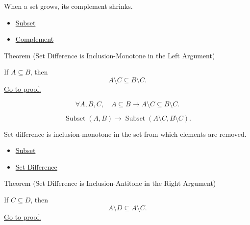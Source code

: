 \begin{remark*}[Interpretation]
When a set grows, its complement shrinks.
\end{remark*}

\begin{dependencies}
\begin{itemize}
  \item \hyperref[def:subset]{Subset}
  \item \hyperref[def:complement]{Complement}
\end{itemize}
\end{dependencies}

\begin{theorembox}{Theorem (Set Difference is Inclusion-Monotone in the Left Argument)}
\begin{theorem}\label{thm:set-difference-monotone-left}
If $A\subseteq B$, then
\[
A\setminus C\subseteq B\setminus C.
\]
\hyperref[prf:set-difference-monotone-left]{Go to proof.}
\end{theorem}
\end{theorembox}


\begin{remark*}
\[
  \forall A,B,C,\quad A\subseteq B\to A\setminus C\subseteq B\setminus C.
\]
\end{remark*}

\begin{remark*}
\[
  \operatorname{Subset}(A,B)
  \to
  \operatorname{Subset}(A\setminus C,B\setminus C).
\]
\end{remark*}

\begin{remark*}[Interpretation]
Set difference is inclusion-monotone in the set from which elements are removed.
\end{remark*}

\begin{dependencies}
\begin{itemize}
  \item \hyperref[def:subset]{Subset}
  \item \hyperref[def:set-difference]{Set Difference}
\end{itemize}
\end{dependencies}

\begin{theorembox}{Theorem (Set Difference is Inclusion-Antitone in the Right Argument)}
\begin{theorem}\label{thm:set-difference-antitone-right}
If $C\subseteq D$, then
\[
A\setminus D\subseteq A\setminus C.
\]
\hyperref[prf:set-difference-antitone-right]{Go to proof.}
\end{theorem}
\end{theorembox}

